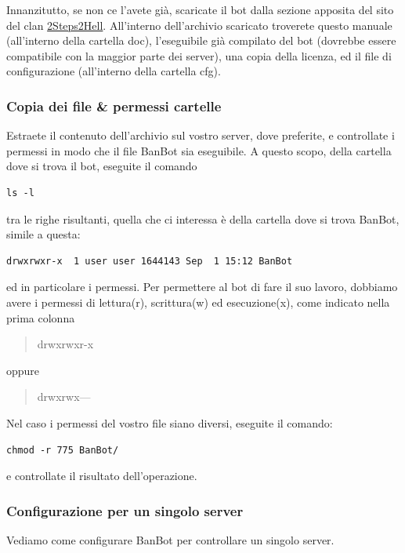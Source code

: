 \documentclass[a4paper]{article}
\begin{document}
Innanzitutto, se non ce l'avete gi\`a, scaricate il bot dalla sezione apposita del sito del clan \href{http://www.2s2h.com}{2Steps2Hell}.
All'interno dell'archivio scaricato troverete questo manuale (all'interno della cartella doc), l'eseguibile gi\`a compilato del bot (dovrebbe essere compatibile con la maggior parte dei server), una copia della licenza, ed il file di configurazione (all'interno della cartella cfg).

\subsubsection{Copia dei file \& permessi cartelle}
Estraete il contenuto dell'archivio sul vostro server, dove preferite, e controllate i permessi in modo che il file BanBot sia eseguibile. A questo scopo, della cartella dove si trova il bot, eseguite il comando
\begin{lstlisting}
ls -l
\end{lstlisting}
tra le righe risultanti, quella che ci interessa \`e della cartella dove si trova BanBot, simile a questa:
\begin{lstlisting}
drwxrwxr-x  1 user user 1644143 Sep  1 15:12 BanBot
\end{lstlisting}
ed in particolare i permessi. Per permettere al bot di fare il suo lavoro, dobbiamo avere i permessi di lettura(r), scrittura(w) ed esecuzione(x), come indicato nella prima colonna
\begin{quote}
drwxrwxr-x
\end{quote}
oppure
\begin{quote}
drwxrwx---
\end{quote}
Nel caso i permessi del vostro file siano diversi, eseguite il comando:
\begin{lstlisting}
chmod -r 775 BanBot/
\end{lstlisting}
e controllate il risultato dell'operazione.

\subsubsection {Configurazione per un singolo server}
\label{ita:singoloServer}
Vediamo come configurare BanBot per controllare un singolo server.
\end{document}
